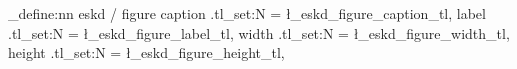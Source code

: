 
\RequirePackage{graphicx}
\RequirePackage{caption}
\RequirePackage{chngcntr}
\RequirePackage{xparse}
\RequirePackage{expl3}
\RequirePackage{float}
\RequirePackage{xcolor}


\newif\ifConfigFigureNumberedBySection
\ConfigFigureNumberedBySectionfalse


\newcommand{\ESKDconfigureFigureCaption}{%
    \captionsetup[figure]{
        justification=\ConfigFigureCaptionJustification,
        singlelinecheck=\ConfigFigureCaptionSingleLineCheck,
        labelsep=\ConfigFigureCaptionLabelSep,
        font=\ConfigFigureCaptionFont
    }
}


\ExplSyntaxOn

\keys_define:nn { eskd / figure }
{
    caption .tl_set:N = \l_eskd_figure_caption_tl,
    label   .tl_set:N = \l_eskd_figure_label_tl,
    width   .tl_set:N = \l_eskd_figure_width_tl,
    height  .tl_set:N = \l_eskd_figure_height_tl,
}


